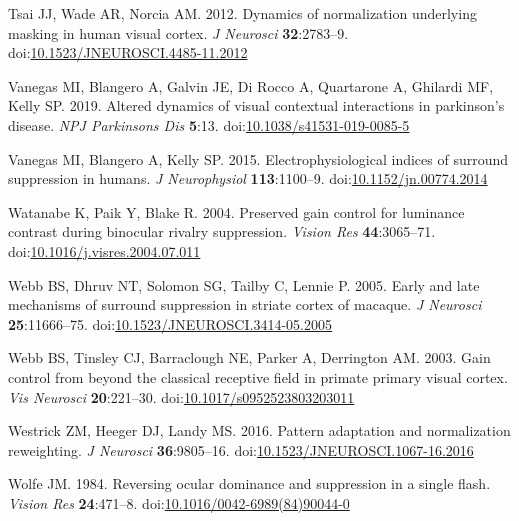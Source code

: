 \documentclass[]{article}
\begin{document}
\leavevmode\hypertarget{ref-Tsai2012}{}%
Tsai JJ, Wade AR, Norcia AM. 2012. Dynamics of normalization underlying masking in human visual cortex. \emph{J Neurosci} \textbf{32}:2783--9. doi:\href{https://doi.org/10.1523/JNEUROSCI.4485-11.2012}{10.1523/JNEUROSCI.4485-11.2012}

\leavevmode\hypertarget{ref-Vanegas2019}{}%
Vanegas MI, Blangero A, Galvin JE, Di Rocco A, Quartarone A, Ghilardi MF, Kelly SP. 2019. Altered dynamics of visual contextual interactions in parkinson's disease. \emph{NPJ Parkinsons Dis} \textbf{5}:13. doi:\href{https://doi.org/10.1038/s41531-019-0085-5}{10.1038/s41531-019-0085-5}

\leavevmode\hypertarget{ref-Vanegas2015}{}%
Vanegas MI, Blangero A, Kelly SP. 2015. Electrophysiological indices of surround suppression in humans. \emph{J Neurophysiol} \textbf{113}:1100--9. doi:\href{https://doi.org/10.1152/jn.00774.2014}{10.1152/jn.00774.2014}

\leavevmode\hypertarget{ref-Watanabe2004}{}%
Watanabe K, Paik Y, Blake R. 2004. Preserved gain control for luminance contrast during binocular rivalry suppression. \emph{Vision Res} \textbf{44}:3065--71. doi:\href{https://doi.org/10.1016/j.visres.2004.07.011}{10.1016/j.visres.2004.07.011}

\leavevmode\hypertarget{ref-Webb2005}{}%
Webb BS, Dhruv NT, Solomon SG, Tailby C, Lennie P. 2005. Early and late mechanisms of surround suppression in striate cortex of macaque. \emph{J Neurosci} \textbf{25}:11666--75. doi:\href{https://doi.org/10.1523/JNEUROSCI.3414-05.2005}{10.1523/JNEUROSCI.3414-05.2005}

\leavevmode\hypertarget{ref-Webb2003}{}%
Webb BS, Tinsley CJ, Barraclough NE, Parker A, Derrington AM. 2003. Gain control from beyond the classical receptive field in primate primary visual cortex. \emph{Vis Neurosci} \textbf{20}:221--30. doi:\href{https://doi.org/10.1017/s0952523803203011}{10.1017/s0952523803203011}

\leavevmode\hypertarget{ref-Westrick2016}{}%
Westrick ZM, Heeger DJ, Landy MS. 2016. Pattern adaptation and normalization reweighting. \emph{J Neurosci} \textbf{36}:9805--16. doi:\href{https://doi.org/10.1523/JNEUROSCI.1067-16.2016}{10.1523/JNEUROSCI.1067-16.2016}

\leavevmode\hypertarget{ref-Wolfe1984}{}%
Wolfe JM. 1984. Reversing ocular dominance and suppression in a single flash. \emph{Vision Res} \textbf{24}:471--8. doi:\href{https://doi.org/10.1016/0042-6989(84)90044-0}{10.1016/0042-6989(84)90044-0}
\end{document}
